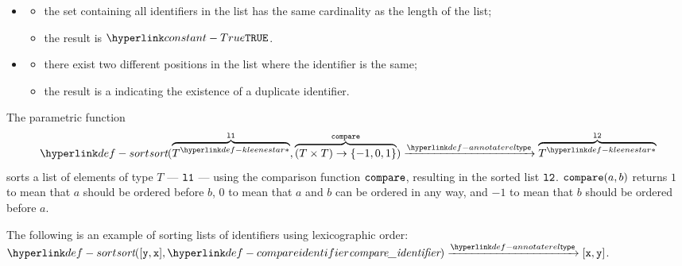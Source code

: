\ProseParagraph
\OneApplies
\begin{itemize}
  \item {}
  \begin{itemize}
    \item the set containing all identifiers in the list has the same cardinality as the length of the list;
    \item the result is $\True$.
  \end{itemize}

  \item {}
  \begin{itemize}
    \item there exist two different positions in the list where the identifier is the same;
    \item the result is a \typingerrorterm{} indicating the existence of a duplicate identifier.
  \end{itemize}
\end{itemize}

\FormallyParagraph
\begin{mathpar}
\end{mathpar}

\begin{mathpar}
\end{mathpar}

\hypertarget{def-sort}{}
The parametric function
\[
\sort(\overname{\KleeneStar{T}}{\vlone}, \overname{(T\times T)\rightarrow \{-1,0,1\}}{\compare}) \typearrow \overname{\KleeneStar{T}}{\vltwo}
\]
sorts a list of elements of type $T$ --- $\vlone$ --- using the comparison function $\compare$,
resulting in the sorted list $\vltwo$.
$\compare(a, b)$ returns $1$ to mean that $a$ should be ordered before $b$,
$0$ to mean that $a$ and $b$ can be ordered in any way,
and $-1$ to mean that $b$ should be ordered before $a$.

The following is an example of sorting lists of identifiers using lexicographic order:\\
$\sort([\vy, \vx], \compareidentifier) \typearrow [\vx, \vy]$.

